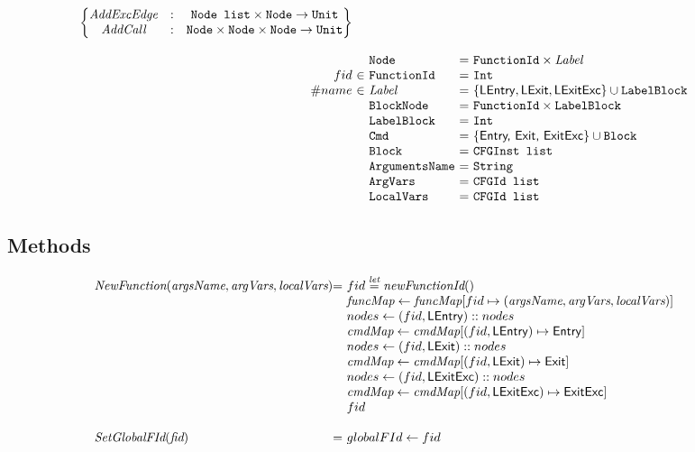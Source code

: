 \[\begin{array}{r@{~}l@{~}l@{}l@{~}l}
\begin{Bmatrix}
	\emph{AddExcEdge} &:&\Nodelist \times\Node \rightarrow \Unit\\
	\emph{AddCall} &:&\Node \times\Node \times\Node \rightarrow \Unit\\
	\end{Bmatrix}\\
&&\\
&&\Node & = & \FunctionId \times \Label\\
fid&\in&\FunctionId &=& \TT{Int}\\
\#name&\in&\Label &=& \{\LEntry, \LExit, \LExitExc\} \cup \TT{LabelBlock}\\
&&\TT{BlockNode} &=& \FunctionId \times \TT{LabelBlock}\\
&&\TT{LabelBlock} &=& \TT{Int}\\
&&\TT{Cmd} &=& \{\SF{Entry, Exit, ExitExc}\} \cup \TT{Block}\\
&&\TT{Block} &=& \TT{CFGInst list}\\
&&\TT{ArgumentsName}\ & = & \TT{String}\\
&&\ArgVars &=& \TT{CFGId list}\\
&&\LocalVars &=& \TT{CFGId list}\\
\end{array}
\]

\subsection{\CFG\ Methods}
\[
\begin{array}{l@{}l@{~}l}
\emph{NewFunction}(\emph{argsName}, \emph{argVars}, \emph{localVars})
	& = & fid \letval \emph{newFunctionId}()\\
	& & \emph{funcMap} \leftarrow \emph{funcMap}[fid \mapsto (\emph{argsName}, \emph{argVars},\emph{localVars})]\\
	& & nodes \leftarrow (fid,\LEntry)::nodes\\
	& & \emph{cmdMap} \leftarrow \emph{cmdMap}[(fid,\LEntry) \mapsto \SF{Entry}]\\
	& & nodes \leftarrow (fid,\LExit)::nodes\\
	& & \emph{cmdMap} \leftarrow \emph{cmdMap}[(fid,\LExit) \mapsto \SF{Exit}]\\
	& & nodes \leftarrow (fid,\LExitExc)::nodes\\
	& & \emph{cmdMap} \leftarrow \emph{cmdMap}[(fid,\LExitExc) \mapsto \SF{ExitExc}]\\
	& & fid\\
	& & \\

\emph{SetGlobalFId}(\emph{fid})
   & = & globalFId \leftarrow fid \\

\end{array}
\]

